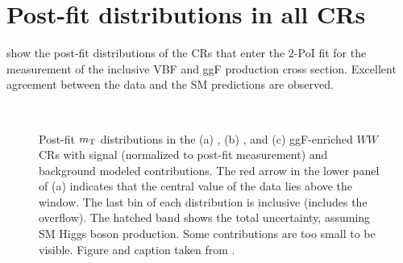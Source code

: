     \clearpage
    \FloatBarrier
    \section{Post-fit distributions in all CRs}
    \label{app:post-fit-cr-dists}

     show the post-fit distributions of the CRs that enter the 2-PoI fit for the measurement of the inclusive VBF and ggF production cross section.
    Excellent agreement between the data and the SM predictions are observed.
    \begin{figure}[htp]
        \centering
         \\
        \caption[Post-fit $\mT$ distributions in the ggF $WW$ control regions.]{
            Post-fit $\mT$ distributions in the (a) \ZeroJet, (b) \OneJet, and (c) ggF-enriched \TwoJet $WW$ CRs with signal (normalized to post-fit measurement) and background modeled contributions.
            The red arrow in the lower panel of (a) indicates that the central value of the data lies above the window. The last bin of each distribution is inclusive (includes the overflow).
            The hatched band shows the total uncertainty, assuming SM Higgs boson production.
            Some contributions are too small to be visible.
            Figure and caption taken from .
            \label{app:fig:WW_CRs}
        }
    \end{figure}
